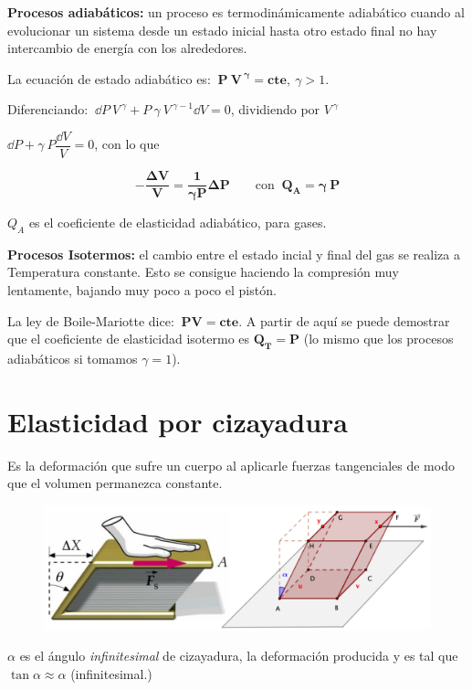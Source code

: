 \textbf{Procesos adiabáticos:} un proceso es termodinámicamente adiabático cuando al evolucionar un sistema desde un estado inicial hasta otro estado final no hay intercambio de energía con los alrededores.

La ecuación de estado adiabático es: $\ \boldsymbol{P \ V^{\ \gamma}=cte},\ \gamma>1$.

Diferenciando: $\ \dd P \ V^{\ \gamma}+ P \ \gamma \ V^{\ \gamma - 1} \dd V = 0$, dividiendo por $V^{\ \gamma}$

$\dd P + \gamma \ P \dfrac {\dd V}{V}=0 $, con lo que

$$\boldsymbol{-\dfrac{\Delta V}{V}=\dfrac {1}{\gamma P} \Delta P}\qquad \text{con } \  \boldsymbol{Q_A=\gamma \ P}$$

$Q_A$ es el coeficiente de elasticidad adiabático, para gases.

\textbf{Procesos Isotermos:} el cambio entre el estado incial y final del gas se realiza a Temperatura constante. Esto se consigue haciendo la compresión muy lentamente, bajando muy poco a poco el pistón.

La ley de Boile-Mariotte dice: $\ \boldsymbol{PV=cte}$. A partir de aquí se puede demostrar que el coeficiente de elasticidad isotermo es $\boldsymbol{Q_T=P}$ (lo mismo que los procesos adiabáticos si tomamos $\gamma=1$).

\section{Elasticidad por cizayadura}

Es la deformación que sufre un cuerpo al aplicarle fuerzas tangenciales de modo que el volumen permanezca constante.

\begin{figure}[H]
	\centering
	\includegraphics[width=1\textwidth]{imagenes/imagenes09/T09IM04.png}
\end{figure}

 $\alpha$ es el ángulo \emph{infinitesimal} de cizayadura, la deformación producida y es tal que $\tan \alpha \approx \alpha$  \textcolor{gris}{(infinitesimal.)}
 
